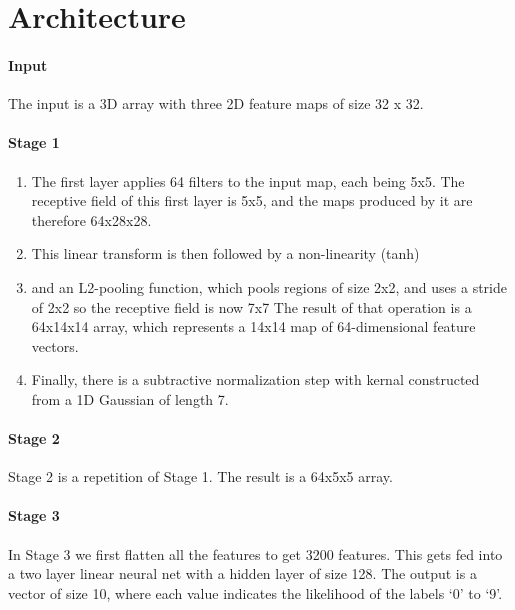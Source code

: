 \documentclass[10pt,letterpaper]{article}
\begin{document}
\section{Architecture}
\label{architecture}

\paragraph{Input}\label{input}

The input is a 3D array with three 2D feature maps of size 32 x 32.

\paragraph{Stage 1}\label{stage-1}

\begin{enumerate}
\def\labelenumi{\arabic{enumi}.}
\item
  The first layer applies 64 filters to the input map, each being 5x5.
  The receptive field of this first layer is 5x5, and the maps produced
  by it are therefore 64x28x28.
\item
  This linear transform is then followed by a non-linearity (tanh)
\item
  and an L2-pooling function, which pools regions of size 2x2, and uses
  a stride of 2x2 so the receptive field is now 7x7 The result of that
  operation is a 64x14x14 array, which represents a 14x14 map of
  64-dimensional feature vectors.
\item
  Finally, there is a subtractive normalization step with kernal
  constructed from a 1D Gaussian of length 7.
\end{enumerate}

\paragraph{Stage 2}\label{stage-2}


Stage 2 is a repetition of Stage 1. The result is a 64x5x5 array.

\paragraph{Stage 3}\label{stage-3}


In Stage 3 we first flatten all the features to get 3200 features. This
gets fed into a two layer linear neural net with a hidden layer of size
128. The output is a vector of size 10, where each value indicates the
likelihood of the labels `0' to `9'.
\end{document}
